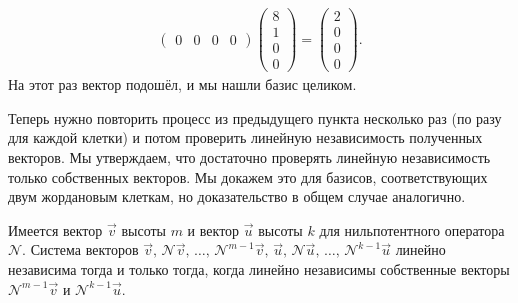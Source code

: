 \begin{solution}
\begin{gather*}
\begin{pmatrix}
			0 & 0 & 0 & 0
		\end{pmatrix}
		\begin{pmatrix}
			8\\
			1\\
			0\\
			0
		\end{pmatrix} =
		\begin{pmatrix}
			2\\
			0\\
			0\\
			0
		\end{pmatrix}.
	\end{gather*}
	На этот раз\footnotemark{} вектор подошёл, и мы нашли базис целиком.
\end{solution}


\medskip
{}
\smallskip

Теперь нужно повторить процесс из предыдущего пункта несколько раз (по разу для каждой клетки) и потом проверить линейную независимость полученных векторов. Мы утверждаем, что достаточно проверять линейную независимость только собственных векторов. Мы докажем это для базисов, соответствующих двум жордановым клеткам, но доказательство в общем случае аналогично.

\begin{lemma}
	Имеется вектор $\vec{v}$ высоты $m$ и вектор $\vec{u}$ высоты $k$ для нильпотентного оператора $\mathcal{N}$. Система векторов $\vec{v},\,\mathcal{N}\vec{v},\,\ldots,\,\mathcal{N}^{m - 1}\vec{v},\,\vec{u},\,\mathcal{N}\vec{u},\,\ldots,\,\mathcal{N}^{k - 1}\vec{u}$ линейно независима тогда и только тогда, когда линейно независимы собственные векторы $\mathcal{N}^{m - 1}\vec{v}$ и $\mathcal{N}^{k - 1}\vec{u}$.
\end{lemma}

